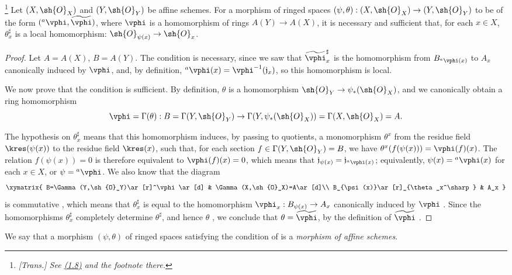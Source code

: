 \begin{theorem}[1.7.3]
\label{I.1.7.3}
\footnote{\emph{[Trans.] See \hyperref[subsection:I.1.8]{(1.8)} and the footnote there.}}
Let $(X,\sh{O}_X)$ and $(Y,\sh{O}_Y)$ be affine schemes.
For a morphism of ringed spaces $(\psi,\theta):(X,\sh{O}_X)\to(Y,\sh{O}_Y)$ to be of the form $({}^a\vphi,\widetilde{\vphi})$, where $\vphi$ is a homomorphism of rings $A(Y)\to A(X)$, it is necessary and sufficient that, for each $x\in X$, $\theta_x^\sharp$ is a local homomorphism: $\sh{O}_{\psi(x)}\to\sh{O}_x$.
\end{theorem}

\begin{proof}
Let $A=A(X)$, $B=A(Y)$.
The condition is necessary, since we saw  that $\widetilde{\vphi}_x^\sharp$ is the homomorphism from $B_{{}^a\vphi(x)}$ to $A_x$ canonically induced by $\vphi$, and, by definition, ${}^a\vphi(x)=\vphi^{-1}(\mathfrak{j}_x)$, so this homomorphism is local.

We now prove that the condition is sufficient.
By definition, $\theta$ is a homomorphism $\sh{O}_Y\to\psi_*(\sh{O}_X)$, and we canonically obtain a ring homomorphism
\[
  \vphi=\Gamma(\theta):B=\Gamma(Y,\sh{O}_Y)
  \to\Gamma(Y,\psi_*(\sh{O}_X))=\Gamma(X,\sh{O}_X)=A.
\]

The hypothesis on $\theta_x^\sharp$ means that this homomorphism induces, by passing to quotients, a monomorphism $\theta^x$ from the residue field $\kres(\psi(x))$ to the residue field $\kres(x)$, such that, for each section $f\in\Gamma(Y,\sh{O}_Y)=B$, we have $\theta^x(f(\psi(x)))=\vphi(f)(x)$.
The relation $f(\psi(x))=0$ is therefore equivalent to $\vphi(f)(x)=0$, which means that $\mathfrak{j}_{\psi(x)}=\mathfrak{j}_{{}^a\vphi(x)}$; equivalently, $\psi(x)={}^a\vphi(x)$ for each $x\in X$, or $\psi={}^a\vphi$.
We also know that the diagram
\[
  \xymatrix{
    B=\Gamma(Y,\sh{O}_Y)\ar[r]^\vphi\ar[d] &
    \Gamma(X,\sh{O}_X)=A\ar[d]\\
    B_{\psi(x)}\ar[r]_{\theta_x^\sharp} &
    A_x
  }
\]
is commutative , which means that $\theta_x^\sharp$ is equal to the homomorphism $\vphi_x:B_{\psi(x)}\to A_x$ canonically induced by $\vphi$ .
Since the homomorphisms $\theta_x^\sharp$ completely determine $\theta^\sharp$, and hence $\theta$ , we conclude that $\theta=\widetilde{\vphi}$, by the definition of $\widetilde{\vphi}$ .
\end{proof}

We say that a morphism $(\psi,\theta)$ of ringed spaces satisfying the condition of  is a \emph{morphism of affine schemes}.

